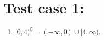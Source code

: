 
\section{Test case 1:}
\begin{enumerate}
    \item ${[0,4)}^\complement = (-\infty,0) \cup {[4,\infty)}$.
\end{enumerate}

%
